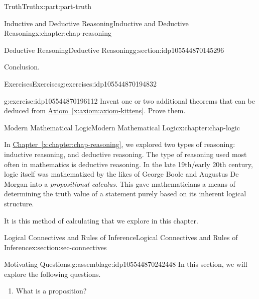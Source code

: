 \documentclass[oneside,10pt,]{book}
\newcommand{\xreffont}{\relax}
\numberwithin{equation}{section}
\begin{document}
\begin{partptx}{Truth}{}{Truth}{}{}{x:part:part-truth}
\begin{chapterptx}{Inductive and Deductive Reasoning}{}{Inductive and Deductive Reasoning}{}{}{x:chapter:chap-reasoning}
\begin{sectionptx}{Deductive Reasoning}{}{Deductive Reasoning}{}{}{g:section:idp105544870145296}
\begin{conclusion}{Conclusion.}
\end{conclusion}%
%
%
\typeout{************************************************}
\typeout{************************************************}
%
\begin{exercises-subsection-numberless}{Exercises}{}{Exercises}{}{}{g:exercises:idp105544870194832}
\begin{divisionexercise}{1}{}{}{g:exercise:idp105544870196112}%
Invent one or two additional theorems that can be deduced from \hyperref[x:axiom:axiom-kittens]{Axiom~{\xreffont\ref{x:axiom:axiom-kittens}}}. Prove them.%
\end{divisionexercise}%
\end{exercises-subsection-numberless}
\end{sectionptx}
\end{chapterptx}
%
\typeout{************************************************}
\typeout{************************************************}
%
\begin{chapterptx}{Modern Mathematical Logic}{}{Modern Mathematical Logic}{}{}{x:chapter:chap-logic}
\begin{introduction}{}%
In \hyperref[x:chapter:chap-reasoning]{Chapter~{\xreffont\ref{x:chapter:chap-reasoning}}}, we explored two types of reasoning: inductive reasoning, and deductive reasoning. The type of reasoning used most often in mathematics is deductive reasoning. In the late 19th\slash{}early 20th century, logic itself was mathematized by the likes of George Boole and Augustus De Morgan into a \emph{propositional calculus}. This gave mathematicians a means of determining the truth value of a statement purely based on its inherent logical structure.%
\par
It is this method of calculating that we explore in this chapter.%
\end{introduction}%
%
%
\typeout{************************************************}
\typeout{************************************************}
%
\begin{sectionptx}{Logical Connectives and Rules of Inference}{}{Logical Connectives and Rules of Inference}{}{}{x:section:sec-connectives}
\begin{assemblage}{Motivating Questions.}{g:assemblage:idp105544870242448}%
In this section, we will explore the following questions. %
\begin{enumerate}
\item{}What is a proposition?%

\end{enumerate}
\end{assemblage}
\end{sectionptx}
\end{chapterptx}
\end{partptx}
\end{document}
